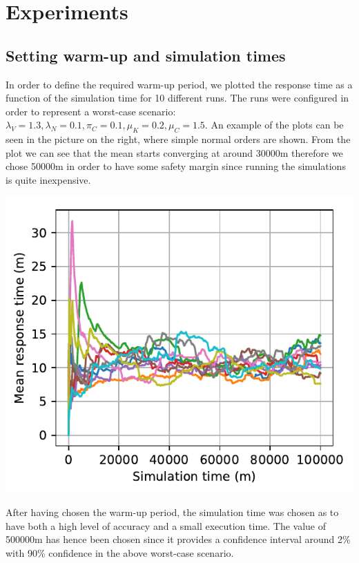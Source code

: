 \section{Experiments}

\subsection{Setting warm-up and simulation times}

\begin{minipage}{.6\textwidth}
  In order to define the required warm-up period, we plotted the response time as a function of the simulation time for 10 different runs. The runs were configured in order to represent a worst-case scenario: $\lambda_V=1.3, \lambda_N=0.1,\pi_C=0.1,\mu_K=0.2,\mu_C=1.5$. An example of the plots can be seen in the picture on the right, where simple normal orders are shown. From the plot we can see that the mean starts converging at around 30000m therefore we chose 50000m in order to have some safety margin since running the simulations is quite inexpensive.
\end{minipage}
\begin{minipage}{.4\textwidth}
  \centering
  \includegraphics[width=\textwidth]{figs/warmup_definition.pdf}
  \label{fig:warmup}
\end{minipage}

After having chosen the warm-up period, the simulation time was chosen as to have both a high level of accuracy and a small execution time. The value of 500000m has hence been chosen since it provides a confidence interval around 2\% with 90\% confidence in the above worst-case scenario.

